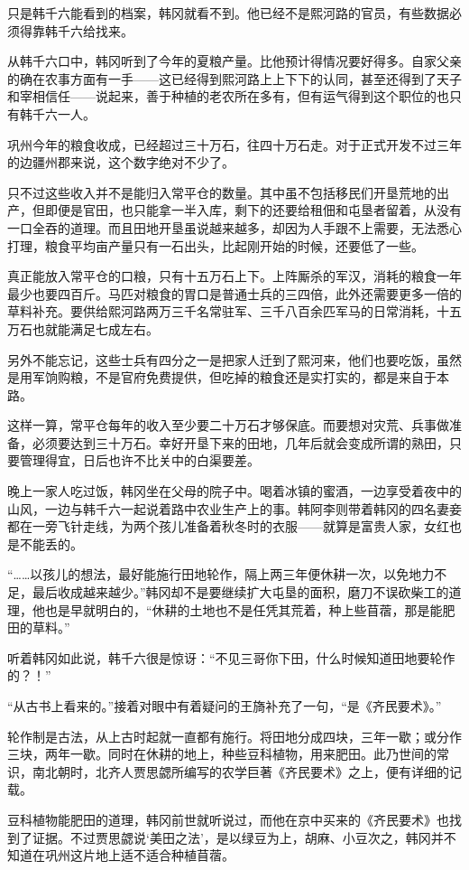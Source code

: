 只是韩千六能看到的档案，韩冈就看不到。他已经不是熙河路的官员，有些数据必须得靠韩千六给找来。

从韩千六口中，韩冈听到了今年的夏粮产量。比他预计得情况要好得多。自家父亲的确在农事方面有一手——这已经得到熙河路上上下下的认同，甚至还得到了天子和宰相信任——说起来，善于种植的老农所在多有，但有运气得到这个职位的也只有韩千六一人。

巩州今年的粮食收成，已经超过三十万石，往四十万石走。对于正式开发不过三年的边疆州郡来说，这个数字绝对不少了。

只不过这些收入并不是能归入常平仓的数量。其中虽不包括移民们开垦荒地的出产，但即便是官田，也只能拿一半入库，剩下的还要给租佃和屯垦者留着，从没有一口全吞的道理。而且田地开垦虽说越来越多，却因为人手跟不上需要，无法悉心打理，粮食平均亩产量只有一石出头，比起刚开始的时候，还要低了一些。

真正能放入常平仓的口粮，只有十五万石上下。上阵厮杀的军汉，消耗的粮食一年最少也要四百斤。马匹对粮食的胃口是普通士兵的三四倍，此外还需要更多一倍的草料补充。要供给熙河路两万三千名常驻军、三千八百余匹军马的日常消耗，十五万石也就能满足七成左右。

另外不能忘记，这些士兵有四分之一是把家人迁到了熙河来，他们也要吃饭，虽然是用军饷购粮，不是官府免费提供，但吃掉的粮食还是实打实的，都是来自于本路。

这样一算，常平仓每年的收入至少要二十万石才够保底。而要想对灾荒、兵事做准备，必须要达到三十万石。幸好开垦下来的田地，几年后就会变成所谓的熟田，只要管理得宜，日后也许不比关中的白渠要差。

晚上一家人吃过饭，韩冈坐在父母的院子中。喝着冰镇的蜜酒，一边享受着夜中的山风，一边与韩千六一起说着路中农业生产上的事。韩阿李则带着韩冈的四名妻妾都在一旁飞针走线，为两个孩儿准备着秋冬时的衣服——就算是富贵人家，女红也是不能丢的。

“……以孩儿的想法，最好能施行田地轮作，隔上两三年便休耕一次，以免地力不足，最后收成越来越少。”韩冈却不是要继续扩大屯垦的面积，磨刀不误砍柴工的道理，他也是早就明白的，“休耕的土地也不是任凭其荒着，种上些苜蓿，那是能肥田的草料。”

听着韩冈如此说，韩千六很是惊讶：“不见三哥你下田，什么时候知道田地要轮作的？！”

“从古书上看来的。”接着对眼中有着疑问的王旖补充了一句，“是《齐民要术》。”

轮作制是古法，从上古时起就一直都有施行。将田地分成四块，三年一歇；或分作三块，两年一歇。同时在休耕的地上，种些豆科植物，用来肥田。此乃世间的常识，南北朝时，北齐人贾思勰所编写的农学巨著《齐民要术》之上，便有详细的记载。

豆科植物能肥田的道理，韩冈前世就听说过，而他在京中买来的《齐民要术》也找到了证据。不过贾思勰说‘美田之法’，是以绿豆为上，胡麻、小豆次之，韩冈并不知道在巩州这片地上适不适合种植苜蓿。

